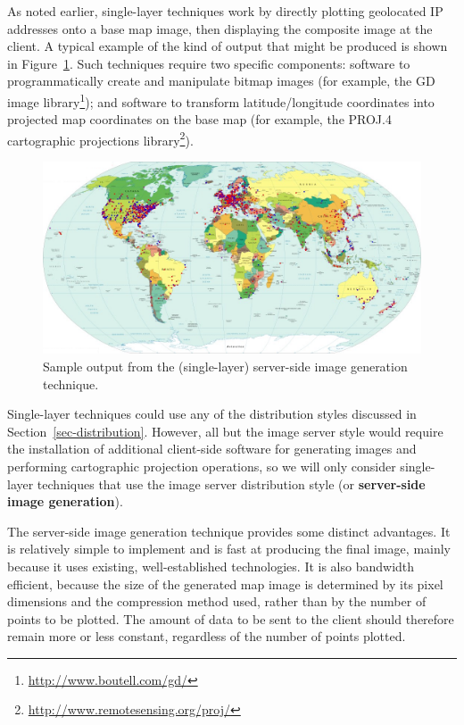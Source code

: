 \documentclass[acmnow]{acmtrans2m}
\begin{document}
As noted earlier, single-layer techniques work by directly plotting
geolocated IP addresses onto a base map image, then displaying the
composite image at the client. A typical example of the kind of output
that might be produced is shown in Figure~\ref{fig-image}. Such
techniques require two specific components: software to programmatically
create and manipulate bitmap images (for example, the GD image
library\footnote{\url{http://www.boutell.com/gd/}}); and software to
transform latitude/longitude coordinates into projected map coordinates
on the base map (for example, the PROJ.4 cartographic projections
library\footnote{\url{http://www.remotesensing.org/proj/}}).


\begin{figure}
	\centering
	\includegraphics[width=\textwidth,keepaspectratio]{ImageGeneration-full}
	\caption{Sample output from the (single-layer) server-side image
		generation technique.}
	\label{fig-image}
\end{figure}


Single-layer techniques could use any of the distribution styles
discussed in Section~\ref{sec-distribution}. However, all but the image
server style would require the installation of additional client-side
software for generating images and performing cartographic projection
operations, so we will only consider single-layer techniques that use
the image server distribution style (or \textbf{server-side image
generation}).

The server-side image generation technique provides some distinct
advantages. It is relatively simple to implement and is fast at
producing the final image, mainly because it uses existing,
well-established technologies. It is also bandwidth efficient, because
the size of the generated map image is determined by its pixel
dimensions and the compression method used, rather than by the number of
points to be plotted. The amount of data to be sent to the client should
therefore remain more or less constant, regardless of the number of
points plotted.
\end{document}
